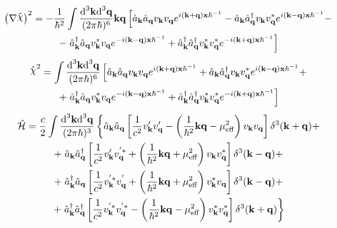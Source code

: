 \begin{multline}
	\left(\mathbf{\nabla}\hat{\rchi}\right)^2=-\frac{1}{\hbar^2}\int\frac{\td^3\mathbf{k}\td^3\mathbf{q}}{(2\pi\hbar)^6}\mathbf{k}\mathbf{q}\left[\hat{a}_\mathbf{k}\hat{a}_\mathbf{q}v_\mathbf{k}v_\mathbf{q}e^{i(\mathbf{k}+\mathbf{q})\mathbf{x}\hbar^{-1}}-\hat{a}_\mathbf{k}\hat{a}_\mathbf{q}^\dagger v_\mathbf{k}v^*_\mathbf{q}e^{i(\mathbf{k}-\mathbf{q})\mathbf{x}\hbar^{-1}}-\right.\\
	-\left.\hat{a}_\mathbf{k}^\dagger\hat{a}_\mathbf{q}v_\mathbf{k}^*v_\mathbf{q}e^{-i(\mathbf{k}-\mathbf{q})\mathbf{x}\hbar^{-1}}+\hat{a}^\dagger_\mathbf{k}\hat{a}^\dagger_\mathbf{q}v^*_\mathbf{k}v^*_\mathbf{q}e^{-i(\mathbf{k}+\mathbf{q})\mathbf{x}\hbar^{-1}}\right]
\end{multline}
\begin{multline}
	\hat{\rchi}^2=\int\frac{\td^3\mathbf{k}\td^3\mathbf{q}}{(2\pi\hbar)^6}\left[\hat{a}_\mathbf{k}\hat{a}_\mathbf{q}v_\mathbf{k}v_\mathbf{q}e^{i(\mathbf{k}+\mathbf{q})\mathbf{x}\hbar^{-1}}+\hat{a}_\mathbf{k}\hat{a}_\mathbf{q}^\dagger v_\mathbf{k}v^*_\mathbf{q}e^{i(\mathbf{k}-\mathbf{q})\mathbf{x}\hbar^{-1}}+\right.\\
	+\left.\hat{a}_\mathbf{k}^\dagger\hat{a}_\mathbf{q}v_\mathbf{k}^*v_\mathbf{q}e^{-i(\mathbf{k}-\mathbf{q})\mathbf{x}\hbar^{-1}}+\hat{a}^\dagger_\mathbf{k}\hat{a}^\dagger_\mathbf{q}v^*_\mathbf{k}v^*_\mathbf{q}e^{-i(\mathbf{k}+\mathbf{q})\mathbf{x}\hbar^{-1}}\right]
\end{multline}
\begin{multline}
	\hat{\mathcal{H}}=\frac{c}{2}\int\frac{\text{d}^3\mathbf{k}\text{d}^3\mathbf{q}}{(2\pi\hbar)^3}\left\{\hat{a}_\mathbf{k}\hat{a}_\mathbf{q}\left[\frac{1}{c^2}v'_\mathbf{k}v'_\mathbf{q}-\left(\frac{1}{\hbar^2}\mathbf{k}\mathbf{q}-\mu^2_{\text{eff}}\right)v_\mathbf{k}v_\mathbf{q}\right]\delta^3(\mathbf{k}+\mathbf{q})+\right.\\
	+\left.\hat{a}_\mathbf{k}\hat{a}^\dagger_\mathbf{q}\left[\frac{1}{c^2}v'_\mathbf{k}v^{'*}_\mathbf{q}+\left(\frac{1}{\hbar^2}\mathbf{k}\mathbf{q}+\mu^2_{\text{eff}}\right)v_\mathbf{k}v^*_\mathbf{q}\right]\delta^3(\mathbf{k}-\mathbf{q})+\right.\\
	+\left.\hat{a}^\dagger_\mathbf{k}\hat{a}_\mathbf{q}\left[\frac{1}{c^2}v^{'*}_\mathbf{k}v^{'}_\mathbf{q}+\left(\frac{1}{\hbar^2}\mathbf{k}\mathbf{q}+\mu^2_{\text{eff}}\right)v^*_\mathbf{k}v_\mathbf{q}\right]\delta^3(\mathbf{k}-\mathbf{q})+\right.\\
	+\left.\hat{a}^\dagger_\mathbf{k}\hat{a}^\dagger_\mathbf{q}\left[\frac{1}{c^2}v^{'*}_\mathbf{k}v^{'*}_\mathbf{q}-\left(\frac{1}{\hbar^2}\mathbf{k}\mathbf{q}-\mu^2_{\text{eff}}\right)v^*_\mathbf{k}v^*_\mathbf{q}\right]\delta^3(\mathbf{k}+\mathbf{q})\right\}
\end{multline}
